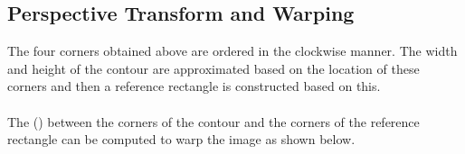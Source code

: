 \pagebreak

\subsection{Perspective Transform and Warping}

The four corners obtained above are ordered in the clockwise manner. The width and height of the contour are approximated based on the location of these corners and then a reference rectangle is constructed based on this. 
\\
\\
The  (\cite{Reference16}) between the corners of the contour and the corners of the reference rectangle can be computed to warp the image as shown below. \\

